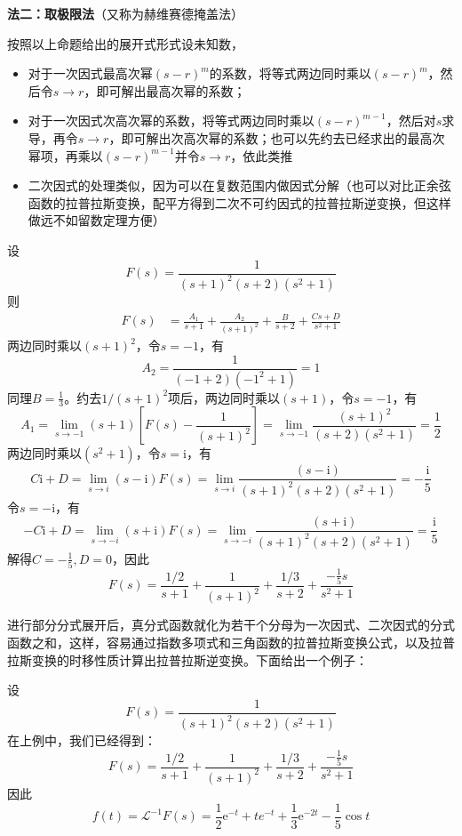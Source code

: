 \documentclass{ctexbook}
\begin{document}
\noindent \textbf{法二：取极限法}（又称为赫维赛德掩盖法）

按照以上命题给出的展开式形式设未知数，\begin{itemize}
    \item 对于一次因式最高次幂$(s-r)^m$的系数，将等式两边同时乘以$(s-r)^m$，然后令$s\to r$，即可解出最高次幂的系数；
    \item 对于一次因式次高次幂的系数，将等式两边同时乘以$(s-r)^{m-1}$，然后对$s$求导，再令$s\to r$，即可解出次高次幂的系数；也可以先约去已经求出的最高次幂项，再乘以$(s-r)^{m-1}$并令$s\to r$，依此类推
    \item 二次因式的处理类似，因为可以在复数范围内做因式分解（也可以对比正余弦函数的拉普拉斯变换，配平方得到二次不可约因式的拉普拉斯逆变换，但这样做远不如留数定理方便）
\end{itemize}

\begin{example}
    设\[F(s)=\frac{1}{(s+1)^2(s+2)(s^2+1)}\]
    则
    \begin{align*}
        F(s)&=\frac{A_1}{s+1}+\frac{A_2}{(s+1)^2}+\frac{B}{s+2}+\frac{C s+D}{s^2+1}
    \end{align*}
    两边同时乘以$(s+1)^2$，令$s=-1$，有
    \[A_2=\frac{1}{(-1+2)(-1^2+1)}=1\]
    同理$B=\frac{1}{3}$。约去$1/(s+1)^2$项后，两边同时乘以$(s+1)$，令$s=-1$，有
    \[A_1=\lim_{s\to -1}(s+1)\left[F(s)-\frac{1}{(s+1)^2}\right]=\lim_{s\to -1}\frac{(s+1)^2}{(s+2)(s^2+1)}=\frac{1}{2}\]
    两边同时乘以$(s^2+1)$，令$s=\mathrm{i}$，有
    \[C \mathrm{i}+D=\lim_{s\to i}(s-\mathrm{i})F(s)=\lim_{s\to i}\frac{(s-\mathrm{i})}{(s+1)^2(s+2)(s^2+1)}=-\frac{\mathrm{i}}{5}\]
    令$s=-\mathrm{i}$，有
    \[-C \mathrm{i}+D=\lim_{s\to -i}(s+\mathrm{i})F(s)=\lim_{s\to -i}\frac{(s+\mathrm{i})}{(s+1)^2(s+2)(s^2+1)}=\frac{\mathrm{i}}{5}\]
    解得$C=-\frac{1}{5},D=0$，因此
    \[F(s)=\frac{1/2}{s+1}+\frac{1}{(s+1)^2}+\frac{1/3}{s+2}+\frac{-\frac{1}{5}s}{s^2+1}\]
\end{example}

进行部分分式展开后，真分式函数就化为若干个分母为一次因式、二次因式的分式函数之和，这样，容易通过指数多项式和三角函数的拉普拉斯变换公式，以及拉普拉斯变换的时移性质计算出拉普拉斯逆变换。下面给出一个例子：
\begin{example}[部分分式展开法求拉普拉斯逆变换]
    设\[F(s)=\frac{1}{(s+1)^2(s+2)(s^2+1)}\]
    在上例中，我们已经得到：
    \[F(s)=\frac{1/2}{s+1}+\frac{1}{(s+1)^2}+\frac{1/3}{s+2}+\frac{-\frac{1}{5}s}{s^2+1}\]
    因此
    \[f(t)=\mathcal{L}^{-1}F(s)=\frac{1}{2}\mathrm{e}^{-t}+te^{-t}+\frac{1}{3}\mathrm{e}^{-2t}-\frac{1}{5}\cos t\]
\end{example}
\end{document}
